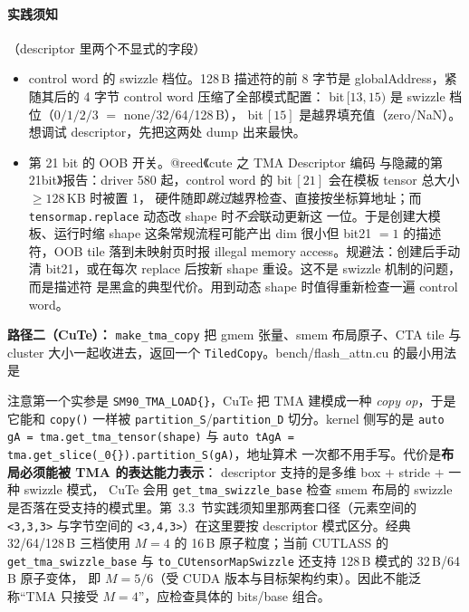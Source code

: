 \paragraph{实践须知}（descriptor 里两个不显式的字段）
\begin{itemize}
  \item control word 的 swizzle 档位。128\,B 描述符的前 8 字节是
        globalAddress，紧随其后的 4 字节 control word 压缩了全部模式配置：
        bit$\,[13,15)$ 是 swizzle 档位（$0/1/2/3$ $=$ none/32/64/128\,B），
        bit$\,[15]$ 是越界填充值（zero/NaN）。想调试 descriptor，先把这两处
        dump 出来最快。
  \item 第 21 bit 的 OOB 开关。@reed《cute 之 TMA Descriptor 编码
        与隐藏的第 21bit》报告：driver 580 起，control word 的
        bit$\,[21]$ 会在模板 tensor 总大小 $\ge 128$\,KB 时被置 1，
        硬件随即\emph{跳过}越界检查、直接按坐标算地址；而
        \texttt{tensormap.\allowbreak{}replace} 动态改 shape 时\emph{不会}联动更新这
        一位。于是创建大模板、运行时缩 shape 这条常规流程可能产出
        dim 很小但 bit21 $=1$ 的描述符，OOB tile 落到未映射页时报
        illegal memory access。规避法：创建后手动清 bit21，或在每次
        replace 后按新 shape 重设。这不是 swizzle 机制的问题，而是描述符
        是黑盒的典型代价。用到动态 shape 时值得重新检查一遍 control
        word。
\end{itemize}

\textbf{路径二（CuTe）：} \texttt{make\_\allowbreak{}tma\_\allowbreak{}copy} 把 gmem 张量、smem
布局原子、CTA tile 与 cluster 大小一起收进去，返回一个
\texttt{TiledCopy}。bench/flash\_attn.cu 的最小用法是



注意第一个实参是 \texttt{SM90\_\allowbreak{}TMA\_\allowbreak{}LOAD\{\}}，CuTe 把 TMA 建模成一种
\emph{copy op}，于是它能和 \texttt{copy()} 一样被
\texttt{partition\_S}/\texttt{partition\_D} 切分。kernel 侧写的是
\texttt{auto g\allowbreak{}A =\allowbreak{} tma.\allowbreak{}get\_\allowbreak{}tma\_\allowbreak{}tensor\allowbreak{}(shape)} 与
\texttt{auto t\allowbreak{}Ag\allowbreak{}A =\allowbreak{} tma.\allowbreak{}get\_\allowbreak{}slice\allowbreak{}(\_\allowbreak{}0\{\}).\allowbreak{}partition\_\allowbreak{}S\allowbreak{}(g\allowbreak{}A)}，地址算术
一次都不用手写。代价是\textbf{布局必须能被 TMA 的表达能力表示}：
descriptor 支持的是多维 box $+$ stride $+$ 一种 swizzle 模式，
CuTe 会用 \texttt{get\_\allowbreak{}tma\_\allowbreak{}swizzle\_\allowbreak{}base} 检查 smem 布局的 swizzle
是否落在受支持的模式里。第~3.3~节实践须知里那两套口径（元素空间的
\texttt{<3,3,3>} 与字节空间的 \texttt{<3,4,3>}）在这里要按 descriptor
模式区分。经典 32/64/128\,B 三档使用 $M=4$ 的 16\,B 原子粒度；当前
CUTLASS 的 \texttt{get\_tma\_swizzle\_base} 与
\texttt{to\_CUtensorMapSwizzle} 还支持 128\,B 模式的 32\,B/64\,B 原子变体，
即 $M=5/6$（受 CUDA 版本与目标架构约束）。因此不能泛称“TMA 只接受
$M=4$”，应检查具体的 bits/base 组合。

